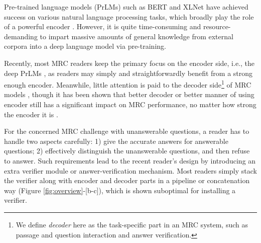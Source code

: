 \documentclass[letterpaper]{article} %
\begin{document}
Pre-trained language models (PrLMs) such as BERT \cite{devlin2018bert} and XLNet \cite{yang2019xlnet} have achieved success on various natural language processing tasks, which broadly play the role of a powerful encoder \cite{zhang2019explicit,li2020explicit,zhou2019limit}. %
However, it is quite time-consuming and resource-demanding to impart massive amounts of general knowledge from external corpora into a deep language model via pre-training. %



Recently, most MRC readers keep the primary focus on the encoder side, i.e., the deep PrLMs \cite{devlin2018bert,yang2019xlnet,Lan2020ALBERT}, as readers may simply and straightforwardly benefit from a strong enough encoder. Meanwhile, little attention is paid to the decoder side\footnote{We define \textit{decoder} here as the task-specific part in an MRC system, such as passage and question interaction and answer verification.} of MRC models %
\cite{hu2019read,back2020neurquri,reddy2020answer}, though it has been shown that better decoder or better manner of using encoder still has a significant impact on MRC performance, no matter how strong the encoder it is \cite{dcmn20,liu2021filling,li2019dependency,li2018unified,zhu2020dual}.


For the concerned MRC challenge with unanswerable questions, a reader has to handle two aspects carefully: 1) give the accurate answers for answerable questions; 2) effectively distinguish the unanswerable questions, and then refuse to answer. Such requirements lead to the recent reader's design by introducing an extra verifier module or answer-verification mechanism. Most readers simply stack the verifier along with encoder and decoder parts in a pipeline or concatenation way (Figure \ref{fig:overview}-[b-c]), which is shown suboptimal for installing a verifier.
\end{document}
